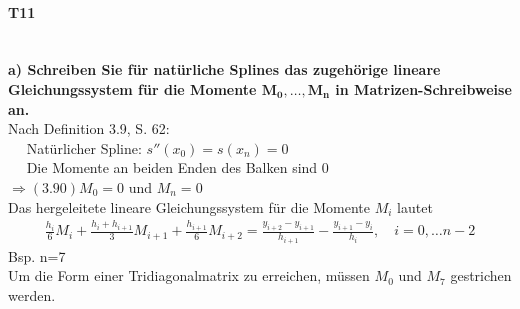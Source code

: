 \documentclass[10pt,a4paper]{article}
\begin{document}
	\paragraph{T11}\mbox{}\\
	\textbf{%
		a) Schreiben Sie für natürliche Splines das zugehörige lineare Gleichungssystem für die Momente $\pmb{M_0, \dots, M_n}$ in Matrizen-Schreibweise an.
	}\\
		Nach Definition 3.9, S. 62:\\
		$\mbox{}\quad$ Natürlicher Spline: $s''(x_0)=s(x_n)=0$ \\
		$\mbox{}\quad$ Die Momente an beiden Enden des Balken sind 0 $\Rightarrow (3.90) M_0=0 \text{ und } M_n=0$ \\
		Das hergeleitete lineare Gleichungssystem für die Momente $M_i$ lautet
		\begin{align*}
			\frac{h_i}{6}M_i+\frac{h_i+h_{i+1}}{3}M_{i+1}+\frac{h_{i+1}}{6}M_{i+2} 
				= \frac{y_{i+2}-y_{i+1}}{h_{i+1}}-\frac{y_{i+1}-y_i}{h_i}, \quad i = 0,\dots n-2
		\end{align*}
		Bsp. n=7 \\
		Um die Form einer Tridiagonalmatrix zu erreichen, müssen $M_0$ und $M_7$ gestrichen werden.
\end{document}
